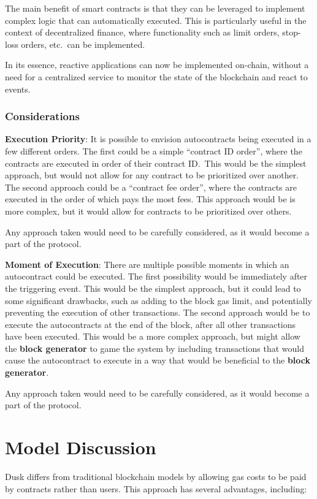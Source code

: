 \documentclass[twocolumn, nofootinbib]{revtex4-2} %
\newcommand{\emphasize}[1]{\textbf{#1}\xspace}
\newcommand{\blockgenerator}{\emphasize{block generator}}
\begin{document}
    The main benefit of smart contracts is that they can be leveraged to implement
    complex logic that can automatically executed.
    This is particularly useful in the context of decentralized finance, where
    functionality such as limit orders, stop-loss orders, etc.\ can be implemented.

    In its essence, reactive applications can now be implemented on-chain, without
    a need for a centralized service to monitor the state of the blockchain and
    react to events.

    \subsubsection*{Considerations}\label{subsubsec:considerations}

    \textbf{Execution Priority}: It is possible to envision autocontracts being
    executed in a few different orders.
    The first could be a simple ``contract ID order'', where the contracts are
    executed in order of their contract ID.\
    This would be the simplest approach, but would not allow for any contract
    to be prioritized over another.
    The second approach could be a ``contract fee order'', where the contracts
    are executed in the order of which pays the most fees.
    This approach would be is more complex, but it would allow for contracts
    to be prioritized over others.

    Any approach taken would need to be carefully considered, as it would
    become a part of the protocol.

    \textbf{Moment of Execution}: There are multiple possible moments in which an
    autocontract could be executed.
    The first possibility would be immediately after the triggering event.
    This would be the simplest approach, but it could lead to some significant
    drawbacks, such as adding to the block gas limit, and potentially preventing the
    execution of other transactions.
    The second approach would be to execute the autocontracts at the end of the
    block, after all other transactions have been executed.
    This would be a more complex approach, but might allow the \blockgenerator to
    game the system by including transactions that would cause the autocontract to
    execute in a way that would be beneficial to the \blockgenerator.

    Any approach taken would need to be carefully considered, as it would
    become a part of the protocol.

    \section*{Model Discussion}\label{sec:discussion}
    Dusk differs from traditional blockchain models by allowing gas costs to be
    paid by contracts rather than users.
    This approach has several advantages, including:
\end{document}
